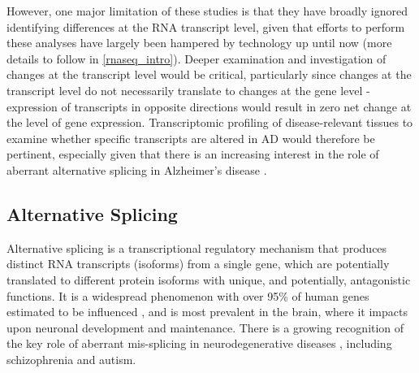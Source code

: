However, one major limitation of these studies is that they have broadly ignored identifying differences at the RNA transcript level, given that efforts to perform these analyses have largely been hampered by technology up until now (more details to follow in \cref{rnaseq_intro}). Deeper examination and investigation of changes at the transcript level would be critical, particularly since changes at the transcript level do not necessarily translate to changes at the gene level - expression of transcripts in opposite directions would result in zero net change at the level of gene expression. Transcriptomic profiling of disease-relevant tissues to examine whether specific transcripts are altered in AD would therefore be pertinent, especially given that there is an increasing interest in the role of aberrant alternative splicing in Alzheimer's disease \cite{Raj2018}.

\subsection{Alternative Splicing}
Alternative splicing is a transcriptional regulatory mechanism that produces distinct RNA transcripts (isoforms) from a single gene, which are potentially translated to different protein isoforms with unique, and potentially, antagonistic functions\cite{Wang2008}. It is a widespread phenomenon with over 95\% of human genes estimated to be influenced \cite{Pan2008}, and is most prevalent in the brain\cite{Yeo2004}, where it impacts upon neuronal development and maintenance\cite{Pan2008, Mazin2014, Raj2015}. There is a growing recognition of the key role of aberrant mis-splicing in neurodegenerative diseases \cite{Gandal2018,RL2019}, including schizophrenia and autism. 

